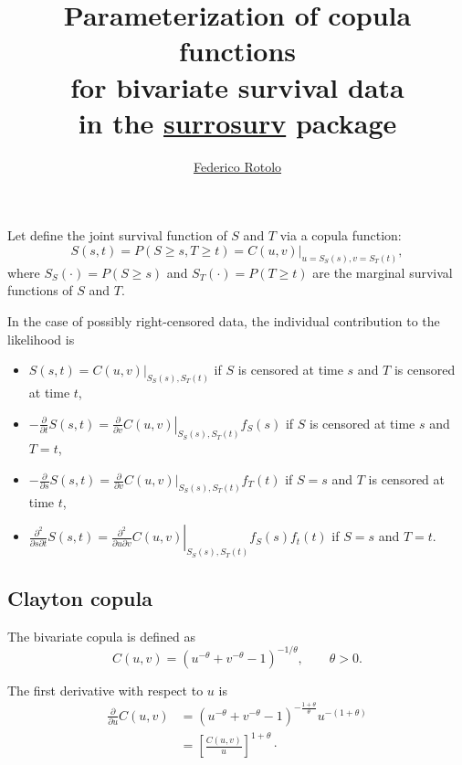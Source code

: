 \documentclass{article}
\title{Parameterization of copula functions \\
  for bivariate survival data \\
  in the \href{http://r-forge.r-project.org/projects/surrosurv}{surrosurv} package}
\author{\href{mailto:Federico Rotolo <federico.rotolo@gustaveroussy.fr>
?Subject=R:::surrosurv}{Federico Rotolo}}
\begin{document}
\maketitle


Let define the joint survival function of $S$ and $T$
    via a copula function:
    \begin{equation}
    S(s, t) = P(S\ge s, T\ge t) = \left.C(u,v)\right|_{u = S_S(s), v = S_T(t)},
    \end{equation}
    where $S_S(\cdot)=P(S\ge s)$ and $S_T(\cdot)=P(T\ge t)$
    are the marginal survival functions of $S$ and $T$.

In the case of possibly right-censored data,
    the individual contribution to the likelihood is
\begin{itemize}
\item $S(s, t) = \left.C(u,v)\right|_{S_S(s), S_T(t)}$
    if $S$ is censored at time $s$ and $T$ is censored at time $t$,
\item $-\frac{\partial}{\partial t}S(s, t) = 
    \left.\frac{\partial}{\partial v} C(u,v)\right|_{S_S(s), S_T(t)} f_S(s)$
    if $S$ is censored at time $s$ and $T=t$,
\item $-\frac{\partial}{\partial s}S(s, t) =
    \frac{\partial}{\partial v}\left.C(u,v)\right|_{S_S(s), S_T(t)} f_T(t)$
    if $S=s$ and $T$ is censored at time $t$,
\item $\frac{\partial^2}{\partial s \partial t}S(s, t) = 
    \left.\frac{\partial^2}{\partial u \partial v}C(u,v)\right|_{S_S(s), S_T(t)}
    f_S(s)f_t(t)$ if $S=s$ and $T=t$.
\end{itemize}


\subsection*{Clayton copula}
The bivariate \cite{Clayton78} copula is defined as
\begin{equation}
    C(u,v)= \left(
        u^{-\theta} + v^{-\theta} - 1
        \right)^{-1/\theta}, \qquad \theta > 0.
\end{equation}

The first derivative with respect to $u$ is 
\begin{align}
    \frac{\partial}{\partial u}C(u,v)
    &=\left(u^{-\theta} + v^{-\theta} - 1\right)^{-\frac{1+\theta}\theta}
        u^{-(1+\theta)}
        \nonumber\\
    &=\left[\frac{C(u, v)}u\right]^{1+\theta}\cdot
\end{align}
\end{document}
